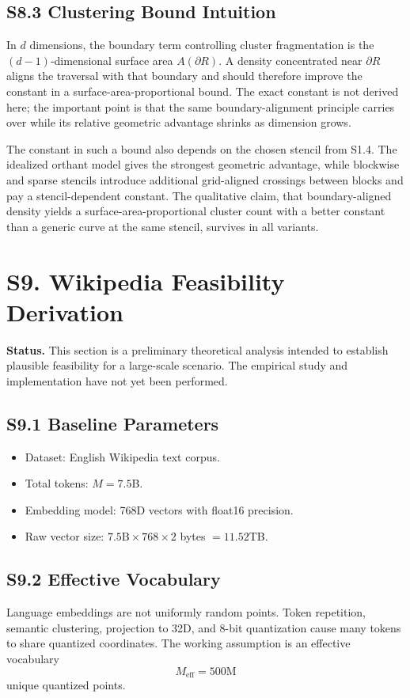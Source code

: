 \documentclass[11pt]{article}
\begin{document}
\subsection*{S8.3 Clustering Bound Intuition}
In $d$ dimensions, the boundary term controlling cluster fragmentation is the $(d-1)$-dimensional surface area $A(\partial R)$. A density concentrated near $\partial R$ aligns the traversal with that boundary and should therefore improve the constant in a surface-area-proportional bound. The exact constant is not derived here; the important point is that the same boundary-alignment principle carries over while its relative geometric advantage shrinks as dimension grows.

The constant in such a bound also depends on the chosen stencil from S1.4. The idealized orthant model gives the strongest geometric advantage, while blockwise and sparse stencils introduce additional grid-aligned crossings between blocks and pay a stencil-dependent constant. The qualitative claim, that boundary-aligned density yields a surface-area-proportional cluster count with a better constant than a generic curve at the same stencil, survives in all variants.

\section*{S9. Wikipedia Feasibility Derivation}
\label{sec:si-wikipedia}

\textbf{Status.} This section is a preliminary theoretical analysis intended to establish plausible feasibility for a large-scale scenario. The empirical study and implementation have not yet been performed.

\subsection*{S9.1 Baseline Parameters}
\begin{itemize}[leftmargin=1.5em]
    \item Dataset: English Wikipedia text corpus.
    \item Total tokens: $M=7.5$B.
    \item Embedding model: 768D vectors with float16 precision.
    \item Raw vector size: $7.5\mathrm{B}\times768\times2$ bytes $=11.52$TB.
\end{itemize}

\subsection*{S9.2 Effective Vocabulary}
Language embeddings are not uniformly random points. Token repetition, semantic clustering, projection to 32D, and 8-bit quantization cause many tokens to share quantized coordinates. The working assumption is an effective vocabulary
\[
M_{\mathrm{eff}}=500\mathrm{M}
\]
unique quantized points.
\end{document}
